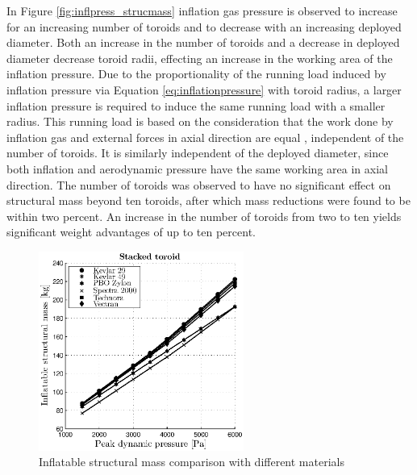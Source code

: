 In Figure \ref{fig:inflpress_strucmass} inflation gas pressure is observed to increase for an increasing number of toroids and to decrease with an increasing deployed diameter. Both an increase in the number of toroids and a decrease in deployed diameter decrease toroid radii, effecting an increase in the working area of the inflation pressure. Due to the proportionality of the running load induced by inflation pressure via Equation \ref{eq:inflationpressure} with toroid radius, a larger inflation pressure is required to induce the same running load with a smaller radius. This running load is based on the consideration that the work done by inflation gas and external forces in axial direction are equal \cite{Brown2009}, independent of the number of toroids. It is similarly independent of the deployed diameter, since both inflation and aerodynamic pressure have the same working area in axial direction.
The number of toroids was observed to have no significant effect on structural mass beyond ten toroids, after which mass reductions were found to be within two percent. An increase in the number of toroids from two to ten yields significant weight advantages of up to ten percent. 

\begin{figure}[h]
	\centering
	\includegraphics[width=0.6\textwidth]{./Figure/Structure/material_test.eps}
	\caption{Inflatable structural mass comparison with different materials}
	\label{fig:mat}
\end{figure}

